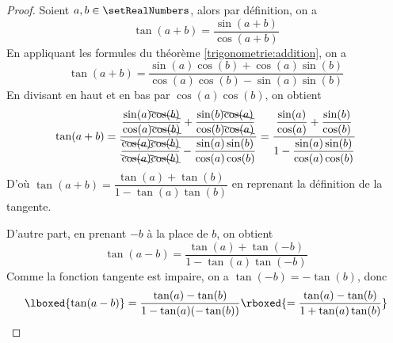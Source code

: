 \begin{proof}
Soient $a, b \in \setRealNumbers$, alors par définition, on a
\[
\tan(a+b) = \dfrac{\sin(a+b)}{\cos(a+b)}
\]
En appliquant les formules du théorème \ref{trigonometrie:addition}, on a 
\[
\tan(a+b) = \dfrac{\sin(a)\cos(b) + \cos(a)\sin(b)}{\cos(a)\cos(b) - \sin(a)\sin(b)}
\]
En divisant en haut et en bas par $\cos(a)\cos(b)$, on obtient
\[
\tan(a+b) 
=\dfrac{\dfrac{\sin(a)\bcancel{\cos(b)}}{\cos(a)\bcancel{\cos(b)}} + \dfrac{\sin(b)\bcancel{\cos(a)}}{\cos(b)\bcancel{\cos(a)}}}{\dfrac{\bcancel{\cos(a)}\bcancel{\cos(b)}}{\bcancel{\cos(a)}\bcancel{\cos(b)}} - \dfrac{\sin(a)\sin(b)}{\cos(a)\cos(b)}} 
= \dfrac{\dfrac{\sin(a)}{\cos(a)} + \dfrac{\sin(b)}{\cos(b)}}{1 - \dfrac{\sin(a)\sin(b)}{\cos(a)\cos(b)}}
\]
D'où $\boxed{\tan(a+b) = \dfrac{\tan(a)+\tan(b)}{1 - \tan(a)\tan(b)}}$ en reprenant la définition de la tangente. 

D'autre part, en prenant $-b$ à la place de $b$, on obtient
\[
\tan(a-b) = \dfrac{\tan(a)+\tan(-b)}{1 - \tan(a)\tan(-b)}
\]
Comme la fonction tangente est impaire, on a $\tan(-b)=-\tan(b)$, donc
\[
\lboxed{\tan(a-b)} = \dfrac{\tan(a)-\tan(b)}{1 - \tan(a)(-\tan(b))} \rboxed{= \dfrac{\tan(a)-\tan(b)}{1 + \tan(a)\tan(b)}}
\]
\end{proof}
